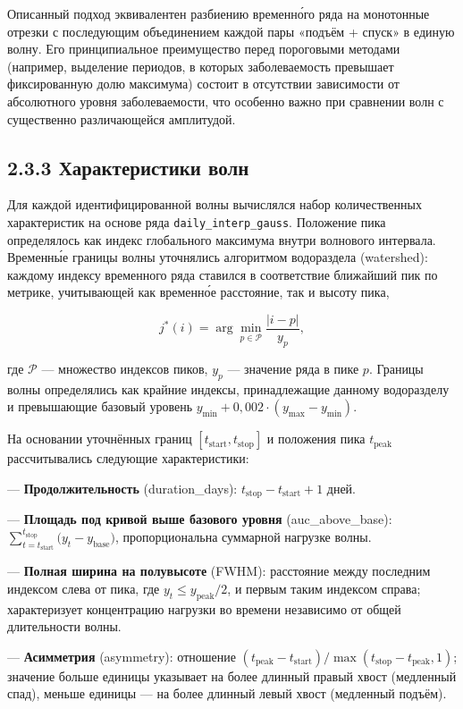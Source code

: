 \documentclass[12pt]{article}
\begin{document}
Описанный подход эквивалентен разбиению временно́го ряда на монотонные
отрезки с последующим объединением каждой пары «подъём + спуск» в единую
волну. Его принципиальное преимущество перед пороговыми методами
(например, выделение периодов, в которых заболеваемость превышает
фиксированную долю максимума) состоит в отсутствии зависимости от
абсолютного уровня заболеваемости, что особенно важно при сравнении волн
с существенно различающейся амплитудой.

\subsection{2.3.3 Характеристики
волн}\label{ux445ux430ux440ux430ux43aux442ux435ux440ux438ux441ux442ux438ux43aux438-ux432ux43eux43bux43d}

Для каждой идентифицированной волны вычислялся набор количественных
характеристик на основе ряда \texttt{daily\_interp\_gauss}. Положение
пика определялось как индекс глобального максимума внутри волнового
интервала. Временны́е границы волны уточнялись алгоритмом водораздела
(watershed): каждому индексу временного ряда ставился в соответствие
ближайший пик по метрике, учитывающей как временно́е расстояние, так и
высоту пика,

\[j^*(i) = \arg\min_{p \in \mathcal{P}} \frac{|i - p|}{y_p},\]

где \(\mathcal{P}\) --- множество индексов пиков, \(y_p\) --- значение
ряда в пике \(p\). Границы волны определялись как крайние индексы,
принадлежащие данному водоразделу и превышающие базовый уровень
\(y_{\min} + 0{,}002 \cdot (y_{\max} - y_{\min})\).

На основании уточнённых границ \([t_{\text{start}}, t_{\text{stop}}]\) и
положения пика \(t_{\text{peak}}\) рассчитывались следующие
характеристики:

--- \textbf{Продолжительность} (duration\_days):
\(t_{\text{stop}} - t_{\text{start}} + 1\) дней.

--- \textbf{Площадь под кривой выше базового уровня} (auc\_above\_base):
\(\sum_{t=t_{\text{start}}}^{t_{\text{stop}}} \bigl(y_t - y_{\text{base}}\bigr)\),
пропорциональна суммарной нагрузке волны.

--- \textbf{Полная ширина на полувысоте} (FWHM): расстояние между
последним индексом слева от пика, где \(y_t \leq y_{\text{peak}}/2\), и
первым таким индексом справа; характеризует концентрацию нагрузки во
времени независимо от общей длительности волны.

--- \textbf{Асимметрия} (asymmetry): отношение
\((t_{\text{peak}} - t_{\text{start}}) / \max(t_{\text{stop}} - t_{\text{peak}}, 1)\);
значение больше единицы указывает на более длинный правый хвост
(медленный спад), меньше единицы --- на более длинный левый хвост
(медленный подъём).
\end{document}
